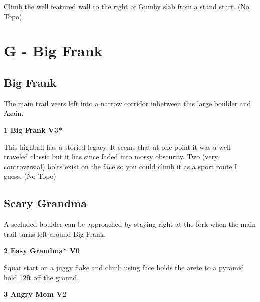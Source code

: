 \begin{multicols}{2}
			\begin{adjustwidth}{0.5cm}{}				
			Climb the well featured wall to the right of Gumby slab from a stand start.
				\newline (No Topo) 
			\end{adjustwidth}
\newpage

		\section{G - Big Frank}\label{sa:Big Frank}
	
	
		\subsection*{Big Frank}\label{bf:Big Frank}
		The main trail veers left into a narrow corridor inbetween this large boulder and Azain.\\
	
			\label{rt:Big Frank}
\colorbox{green!20}{
\parbox{0.95\linewidth}{
\textbf{
1 Big Frank V3*  
}
}
}

			\begin{adjustwidth}{0.5cm}{}				
			This highball has a storied legacy. It seems that at one point it was a well traveled classic but it has since faded into mossy obscurity. Two (very controversial) bolts exist on the face so you could climb it as a sport route I guess.
				\newline (No Topo) 
			\end{adjustwidth}
		\subsection*{Scary Grandma}\label{bf:Scary Grandma}
		A secluded boulder can be approached by staying right at the fork when the main trail turns left around Big Frank.\\
	

			\label{rt:Easy Grandma}
\colorbox{green!20}{
\parbox{0.95\linewidth}{
\textbf{
2 Easy Grandma* V0  
}
}
}

			\begin{adjustwidth}{0.5cm}{}				
			Squat start on a juggy flake and climb using face holds the arete to a pyramid hold 12ft off the ground.
			\end{adjustwidth}
			\label{rt:Angry Mom}
\colorbox{green!20}{
\parbox{0.95\linewidth}{
\textbf{
3 Angry Mom V2  \warn
}
}
}


\end{multicols}
